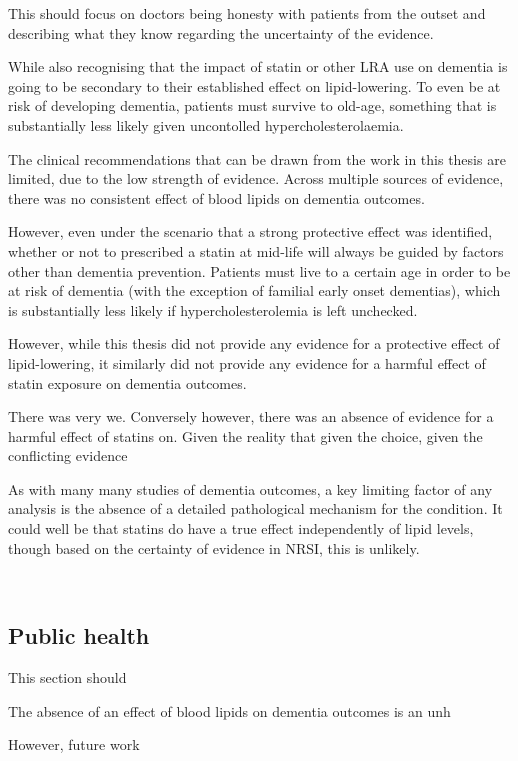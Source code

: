 \documentclass[a4paper, twoside]{templates/ociamthesis}
\begin{document}
This should focus on doctors being honesty with patients from the outset and describing what they know regarding the uncertainty of the evidence.

While also recognising that the impact of statin or other LRA use on dementia is going to be secondary to their established effect on lipid-lowering. To even be at risk of developing dementia, patients must survive to old-age, something that is substantially less likely given uncontolled hypercholesterolaemia.

The clinical recommendations that can be drawn from the work in this thesis are limited, due to the low strength of evidence. Across multiple sources of evidence, there was no consistent effect of blood lipids on dementia outcomes.

However, even under the scenario that a strong protective effect was identified, whether or not to prescribed a statin at mid-life will always be guided by factors other than dementia prevention. Patients must live to a certain age in order to be at risk of dementia (with the exception of familial early onset dementias), which is substantially less likely if hypercholesterolemia is left unchecked.

However, while this thesis did not provide any evidence for a protective effect of lipid-lowering, it similarly did not provide any evidence for a harmful effect of statin exposure on dementia outcomes.

There was very we. Conversely however, there was an absence of evidence for a harmful effect of statins on. Given the reality that given the choice, given the conflicting evidence

As with many many studies of dementia outcomes, a key limiting factor of any analysis is the absence of a detailed pathological mechanism for the condition. It could well be that statins do have a true effect independently of lipid levels, though based on the certainty of evidence in NRSI, this is unlikely.

~

\hypertarget{public-health}{%
\subsection{Public health}\label{public-health}}

This section should

The absence of an effect of blood lipids on dementia outcomes is an unh

However, future work
\end{document}
